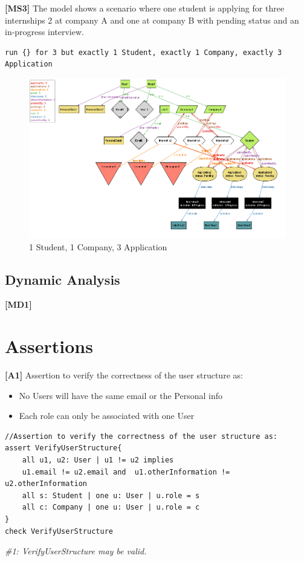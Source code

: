 \textbf{[MS3]} The model shows a scenario where one student is applying for three internships 2 at company A and one at company B with pending status and an in-progress interview.
\begin{lstlisting}
run {} for 3 but exactly 1 Student, exactly 1 Company, exactly 3 Application
\end{lstlisting}
\begin{figure}[H]
    \centering
    \includegraphics[width=0.75\linewidth]{RASD//Images/1st2com.png}
    \caption{1 Student, 1 Company, 3 Application}
    \label{fig:enter-label}
\end{figure}

\subsection{Dynamic Analysis}
\textbf{[MD1]}

\section{ Assertions}
\textbf{[A1]} Assertion to verify the correctness of the user structure as:
\begin{itemize}
    \item No Users will have the same email or the Personal info
    \item Each role can only be associated with one User
\end{itemize}
\begin{lstlisting}
//Assertion to verify the correctness of the user structure as:
assert VerifyUserStructure{
    all u1, u2: User | u1 != u2 implies 
    u1.email != u2.email and  u1.otherInformation != u2.otherInformation
    all s: Student | one u: User | u.role = s
    all c: Company | one u: User | u.role = c
}
check VerifyUserStructure
\end{lstlisting}
\textit{\#1: VerifyUserStructure may be valid.}

